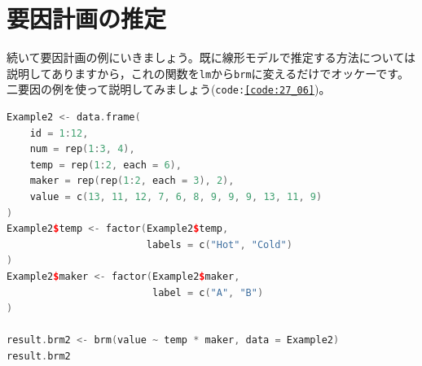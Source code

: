 \documentclass{ltjsarticle}
\begin{document}
\section{要因計画の推定}
続いて要因計画の例にいきましょう。既に線形モデルで推定する方法については説明してありますから，これの関数を\texttt{lm}から\texttt{brm}に変えるだけでオッケーです。二要因の例を使って説明してみましょう(\texttt{code:\ref{code:27_06}})。

\begin{lstlisting}[language=c++,label={code:27_06},caption={データを作ってbrmでベイズ推定}]
Example2 <- data.frame(
    id = 1:12,
    num = rep(1:3, 4),
    temp = rep(1:2, each = 6),
    maker = rep(rep(1:2, each = 3), 2),
    value = c(13, 11, 12, 7, 6, 8, 9, 9, 9, 13, 11, 9)
)
Example2$temp <- factor(Example2$temp,
                        labels = c("Hot", "Cold")
)
Example2$maker <- factor(Example2$maker,
                         label = c("A", "B")
)

result.brm2 <- brm(value ~ temp * maker, data = Example2)
result.brm2
\end{lstlisting}
\end{document}
